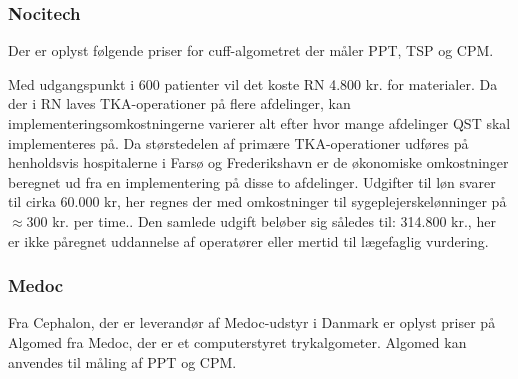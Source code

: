 \subsubsection{Nocitech}
Der er oplyst følgende priser for cuff-algometret der måler PPT, TSP og CPM.

Med udgangspunkt i 600 patienter vil det koste RN 4.800 kr. for materialer. Da der i RN laves TKA-operationer på flere afdelinger, kan implementeringsomkostningerne varierer alt efter hvor mange afdelinger QST skal implementeres på. Da størstedelen af primære TKA-operationer udføres på henholdsvis hospitalerne i Farsø og Frederikshavn er de økonomiske omkostninger beregnet ud fra en implementering på disse to afdelinger. Udgifter til løn svarer til cirka 60.000 kr, her regnes der med omkostninger til sygeplejerskelønninger på $\approx 300$ kr. per time.\citep{DST1}\citep{DST2}. Den samlede udgift beløber sig således til: 314.800 kr., her er ikke påregnet uddannelse af operatører eller mertid til lægefaglig vurdering.

\subsubsection{Medoc}
Fra Cephalon, der er leverandør af Medoc-udstyr i Danmark er oplyst priser på Algomed fra Medoc, der er et computerstyret trykalgometer. Algomed kan anvendes til måling af PPT og CPM. \citep{AlgomedOnline} \citep{AlgomedData}


